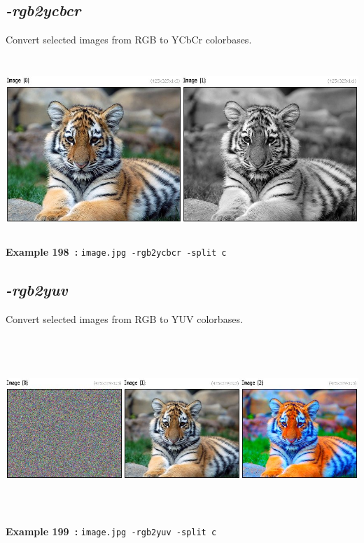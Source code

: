 \documentclass[a4paper,11pt,twoside]{book}
\begin{document}
\subsection{\emph{-rgb2ycbcr} }\vspace*{-0.5em}
Convert selected images from RGB to YCbCr colorbases.
\begin{center}\includegraphics[keepaspectratio=true,height=7cm,width=\textwidth]{img/gmic_def198.jpg}\\
{\footnotesize \textbf{Example 198~:} \texttt{image.jpg -rgb2ycbcr -split c}}
\end{center}

\subsection{\emph{-rgb2yuv} }\vspace*{-0.5em}
Convert selected images from RGB to YUV colorbases.
\begin{center}\includegraphics[keepaspectratio=true,height=7cm,width=\textwidth]{img/gmic_def199.jpg}\\
{\footnotesize \textbf{Example 199~:} \texttt{image.jpg -rgb2yuv -split c}}
\end{center}
\end{document}
